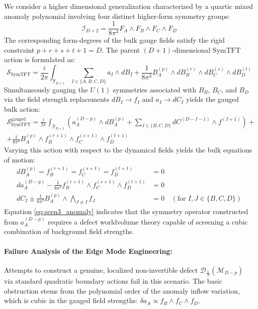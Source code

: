 \documentclass[aps,preprint,nofootinbib,preprintnumbers,eqsecnum,superscriptaddress]{revtex4}
\numberwithin{equation}{section}
\begin{document}
We consider a higher dimensional generalization characterized by a quartic mixed anomaly polynomial involving four distinct higher-form symmetry groups:
\begin{equation}
    \mathcal{I}_{D+2} = \frac{1}{8\pi^3} F_A \wedge F_B \wedge F_C \wedge F_D
\end{equation}
The corresponding form-degrees of the bulk gauge fields satisfy the rigid constraint $p + r + s + t + 1 = D$. The parent $(D+1)$-dimensional $\text{SymTFT}$ action is formulated as:
\begin{equation}
    \mathcal{S}_{\text{SymTFT}} = \frac{i}{2\pi} \int_{\mathcal{Y}_{D+1}} \sum_{I \in \{A,B,C,D\}} a_I \wedge d B_I + \frac{1}{8\pi^3} B^{(p)}_A \wedge d B^{(r)}_B \wedge d B^{(s)}_C \wedge d B^{(t)}_D
\end{equation}
Simultaneously gauging the $U(1)$ symmetries associated with $B_B$, $B_C$, and $B_D$ via the field strength replacements $dB_I \to f_I$ and $a_I \to dC_I$ yields the gauged bulk action:
\begin{multline}
    \mathcal{S}^\text{gauged}_{\text{SymTFT}} = \frac{i}{2\pi} \int_{\mathcal{Y}_{D+1}} \left( a^{(D-p)}_A \wedge d B^{(p)}_A + \sum_{I \in \{B,C,D\}} dC^{(D-I-1)} \wedge f^{(I+1)} \right) +\\+ \frac{1}{8\pi^3} B^{(p)}_A \wedge f^{(r+1)}_B \wedge f^{(s+1)}_C \wedge f^{(t+1)}_D
\end{multline}
Varying this action with respect to the dynamical fields yields the bulk equations of motion:
\begin{align}
    dB^{(p)}_A = f^{(r+1)}_B = f^{(s+1)}_C = f^{(t+1)}_D &= 0 \\
    da^{(D-p)}_A - \frac{1}{8\pi^3} f^{(r+1)}_B \wedge f^{(s+1)}_C \wedge f^{(t+1)}_D &= 0 \label{eq:scen3_anomaly} \\
    dC_I \pm \frac{1}{8\pi^3} B^{(p)}_A \wedge \bigwedge_{J \neq I} f_J &= 0 \quad (\text{for } I,J \in \{B,C,D\})
\end{align}
Equation \eqref{eq:scen3_anomaly} indicates that the symmetry operator constructed from $a^{(D-p)}_A$ requires a defect worldvolume theory capable of screening a cubic combination of background field strengths.

\paragraph{Failure Analysis of the Edge Mode Engineering:}
Attempts to construct a genuine, localized non-invertible defect $\mathcal{D}_{\frac{1}{N}}(\mathcal{M}_{D-p})$ via standard quadratic boundary actions fail in this scenario. The basic obstruction stems from the polynomial order of the anomaly inflow variation, which is cubic in the gauged field strengths: $\delta a_A \propto f_B \wedge f_C \wedge f_D$. 
\end{document}
